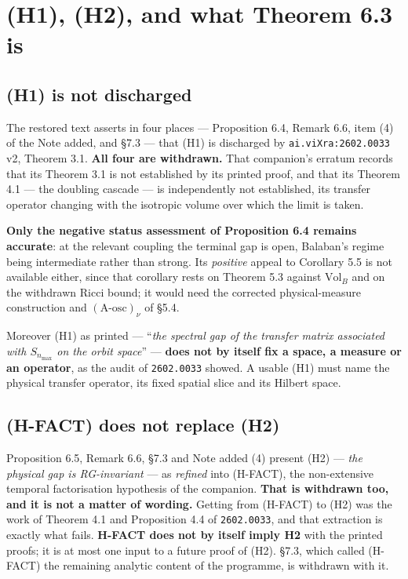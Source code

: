 \documentclass[11pt]{article}
\begin{document}
\section{(H1), (H2), and what Theorem 6.3 is}

\subsection{(H1) is not discharged}

The restored text asserts in four places --- Proposition 6.4, Remark 6.6, item (4) of
the Note added, and \S7.3 --- that (H1) is discharged by \texttt{ai.viXra:2602.0033} v2,
Theorem 3.1. \textbf{All four are withdrawn.} That companion's erratum records that its
Theorem 3.1 is not established by its printed proof, and that its Theorem 4.1 --- the
doubling cascade --- is independently not established, its transfer operator changing
with the isotropic volume over which the limit is taken.

\textbf{Only the negative status assessment of Proposition 6.4 remains accurate}: at the
relevant coupling the terminal gap is open, Balaban's regime being intermediate rather
than strong. Its \emph{positive} appeal to Corollary 5.5 is not available either, since
that corollary rests on Theorem 5.3 against $\mathrm{Vol}_B$ and on the withdrawn Ricci
bound; it would need the corrected physical-measure construction and
$(\text{A-osc})_\nu$ of \S5.4.

Moreover (H1) as printed --- ``\emph{the spectral gap of the transfer matrix associated
with $S_{n_{\max}}$ on the orbit space}'' --- \textbf{does not by itself fix a space, a
measure or an operator}, as the audit of \texttt{2602.0033} showed. A usable (H1) must
name the physical transfer operator, its fixed spatial slice and its Hilbert space.

\subsection{(H-FACT) does not replace (H2)}

Proposition 6.5, Remark 6.6, \S7.3 and Note added (4) present (H2) --- \emph{the
physical gap is RG-invariant} --- as \emph{refined} into (H-FACT), the non-extensive
temporal factorisation hypothesis of the companion. \textbf{That is withdrawn too, and
it is not a matter of wording.} Getting from (H-FACT) to (H2) was the work of Theorem
4.1 and Proposition 4.4 of \texttt{2602.0033}, and that extraction is exactly what
fails. \textbf{H-FACT does not by itself imply H2} with the printed proofs; it is at
most one input to a future proof of (H2). \S7.3, which called (H-FACT) the remaining
analytic content of the programme, is withdrawn with it.
\end{document}
